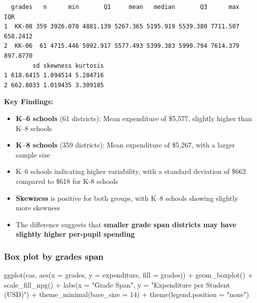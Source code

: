 \documentclass[
  12pt,
  a4paper,
]{scrbook}
\newenvironment{Shaded}{\begin{snugshade}}{\end{snugshade}}
\newcommand{\AttributeTok}[1]{\textcolor[rgb]{0.40,0.45,0.13}{#1}}
\newcommand{\DecValTok}[1]{\textcolor[rgb]{0.68,0.00,0.00}{#1}}
\newcommand{\FunctionTok}[1]{\textcolor[rgb]{0.28,0.35,0.67}{#1}}
\newcommand{\NormalTok}[1]{\textcolor[rgb]{0.00,0.23,0.31}{#1}}
\newcommand{\SpecialCharTok}[1]{\textcolor[rgb]{0.37,0.37,0.37}{#1}}
\newcommand{\StringTok}[1]{\textcolor[rgb]{0.13,0.47,0.30}{#1}}
\newcounter{none} %
\providecommand{\tightlist}{%
  \setlength{\itemsep}{0pt}\setlength{\parskip}{0pt}}
\renewcommand{\tightlist}{\setlength{\itemsep}{0.5\baselineskip}\setlength{\parskip}{0.2\baselineskip}}
\theoremstyle{plain}
\theoremstyle{definition}
\theoremstyle{remark}
\begin{document}
\begin{verbatim}
  grades   n      min       Q1     mean   median       Q3      max      IQR
1  KK-08 359 3926.070 4881.139 5267.365 5195.919 5539.380 7711.507 658.2412
2  KK-06  61 4715.446 5092.917 5577.493 5399.383 5990.794 7614.379 897.8770
        sd skewness kurtosis
1 618.6415 1.094514 5.284716
2 662.8033 1.019435 3.309185
\end{verbatim}

\textbf{Key Findings:}

\begin{itemize}
\tightlist
\item
  \textbf{K--6 schools} (61 districts): Mean expenditure of {\$5,577,}
  slightly higher than K--8 schools
\item
  \textbf{K--8 schools} (359 districts): Mean expenditure of {\$5,267,}
  with a larger sample size
\item
  K--6 schools indicating higher variability, with a standard deviation
  of {\$662} compared to {\$618} for K-8 schools
\item
  \textbf{Skewness} is positive for both groups, with K--8 schools
  showing slightly more skewness
\item
  The difference suggests that \textbf{smaller grade span districts may
  have slightly higher per-pupil spending}
\end{itemize}

\subsubsection{Box plot by grades span}\label{box-plot-by-grades-span}

\begin{Shaded}
\begin{Highlighting}[]
\FunctionTok{ggplot}\NormalTok{(cas, }\FunctionTok{aes}\NormalTok{(}\AttributeTok{x =}\NormalTok{ grades, }\AttributeTok{y =}\NormalTok{ expenditure, }\AttributeTok{fill =}\NormalTok{ grades)) }\SpecialCharTok{+}
  \FunctionTok{geom\_boxplot}\NormalTok{() }\SpecialCharTok{+}
  \FunctionTok{scale\_fill\_npg}\NormalTok{() }\SpecialCharTok{+}
  \FunctionTok{labs}\NormalTok{(}\AttributeTok{x =} \StringTok{"Grade Span"}\NormalTok{,}
       \AttributeTok{y =} \StringTok{"Expenditure per Student (USD)"}\NormalTok{) }\SpecialCharTok{+}
  \FunctionTok{theme\_minimal}\NormalTok{(}\AttributeTok{base\_size =} \DecValTok{14}\NormalTok{) }\SpecialCharTok{+}
  \FunctionTok{theme}\NormalTok{(}\AttributeTok{legend.position =} \StringTok{"none"}\NormalTok{)}
\end{Highlighting}
\end{Shaded}
\end{document}

